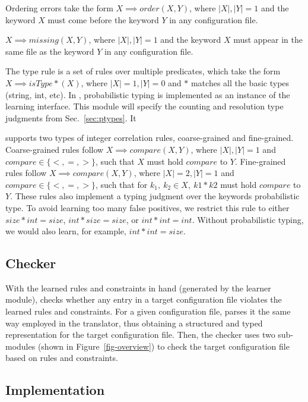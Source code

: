 Ordering errors take the form $X \implies order(X,Y)$, where $|X|,|Y|=1$ and the keyword $X$ must come before the keyword $Y$ in any configuration file.

$X \implies missing(X,Y)$, where $|X|,|Y|=1$ and the keyword $X$ must appear in the same file as the keyword $Y$ in any configuration file.

The type rule is a set of rules over multiple predicates, which take the form $X \implies isType\ast(X)$, where $|X|=1, |Y|=0$ and $\ast$ matches all the basic types (string, int, etc).
In \app, probabilistic typing is implemented as an instance of the learning interface.
This module will specify the counting and resolution type judgments from Sec.~\ref{sec:ptypes}.
It 

\app supports two types of integer correlation rules, coarse-grained and fine-grained.
Coarse-grained rules follow $X \implies compare(X,Y)$, where $|X|,|Y|=1$ and $compare \in \{<,=,>\}$, such that $X$ must hold $compare$ to $Y$.
Fine-grained rules follow $X \implies compare(X,Y)$, where $|X|=2,|Y|=1$ and $compare \in \{<,=,>\}$, such that for $k_1,\ k_2 \in X,\ k1*k2$ must hold $compare$ to $Y$.
These rules also implement a typing judgment over the keywords probabilistic type.
To avoid learning too many false positives, we restrict this rule to either $size*int=size$, $int*size=size$, or $int*int = int$.
Without probabilistic typing, we would also learn, for example, $int*int=size$.

\subsection{Checker}
\label{sec-checker}

With the learned rules and constraints in hand (generated
by the learner module),
\app checks whether any entry in a target configuration file
violates the learned rules and constraints.
For a given configuration file, \app parses it the same
way employed in the translator, thus obtaining a structured
and typed representation for the target configuration file.
Then, the checker uses two sub-modules (shown in 
Figure~\ref{fig-overview}) to check the target
configuration file based on rules and constraints.

\subsection{Implementation}

